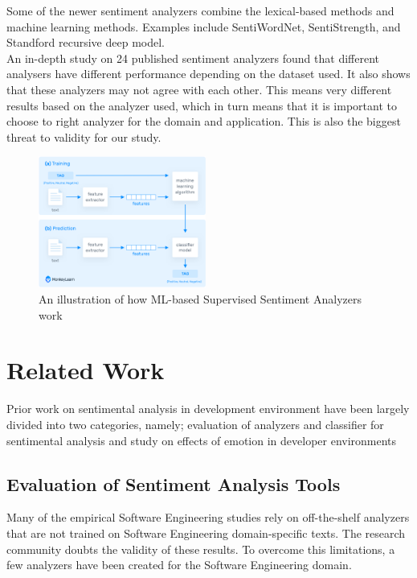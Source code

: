 \documentclass[conference]{IEEEtran}
\begin{document}
Some of the newer sentiment analyzers combine the lexical-based methods and machine learning methods. Examples include SentiWordNet\cite{b15}, SentiStrength\cite{b16}, and Standford recursive deep model\cite{b17}.\\

An in-depth study on 24 published sentiment analyzers found that different analysers have different performance depending on the dataset used.\cite{b13} It also shows that these analyzers may not agree with each other. This means very different results based on the analyzer used, which in turn means that it is important to choose to right analyzer for the domain and application. This is also the biggest threat to validity for our study.\\

\begin{figure}[htbp]
\centerline{\includegraphics[width=0.49\textwidth]{how-does-sentiment-analysis-work.png}}
\caption{An illustration of how ML-based Supervised Sentiment Analyzers work\cite{b32}}
\label{fig}
\end{figure}

\section{Related Work}
Prior work on sentimental analysis in development environment have been largely divided into two categories, namely; evaluation of analyzers and classifier for sentimental analysis and study on effects of emotion in developer environments\\


\subsection{Evaluation of Sentiment Analysis Tools}
Many of the empirical Software Engineering studies rely on off-the-shelf analyzers that are not trained on Software Engineering domain-specific texts. The research community doubts the validity of these results\cite{b21}. To overcome this limitations, a few analyzers have been created for the Software Engineering domain.\\ 
\end{document}
